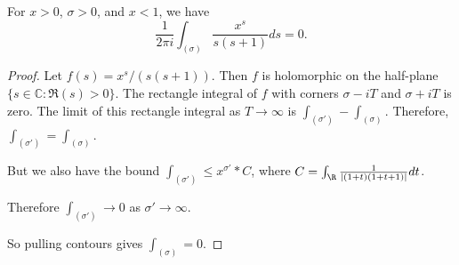 \begin{lemma}[formulaLtOne]
\label{formulaLtOne}
\leanok
For $x>0$, $\sigma>0$, and $x<1$, we have
  $$
  \frac1{2\pi i}
  \int_{(\sigma)}\frac{x^s}{s(s+1)}ds =0.
  $$
\end{lemma}
\begin{proof}
\leanok
Let $f(s) = x^s/(s(s+1))$. Then $f$ is holomorphic on the half-plane
  $\{s\in\mathbb{C}:\Re(s)>0\}$. The rectangle integral of $f$ with corners $\sigma-iT$ and
  $\sigma+iT$ is zero. The limit of this rectangle integral as $T\to\infty$ is
  $\int_{(\sigma')}-\int_{(\sigma)}$. Therefore, $\int_{(\sigma')}=\int_{(\sigma)}$.

But we also have the bound $\int_{(\sigma')} \leq x^{\sigma'} * C$, where
  $C=\int_\R\frac{1}{|(1+t)(1+t+1)|}dt$.

Therefore $\int_{(\sigma')}\to 0$ as $\sigma'\to\infty$.

So pulling contours gives $\int_{(\sigma)}=0$.
\end{proof}
